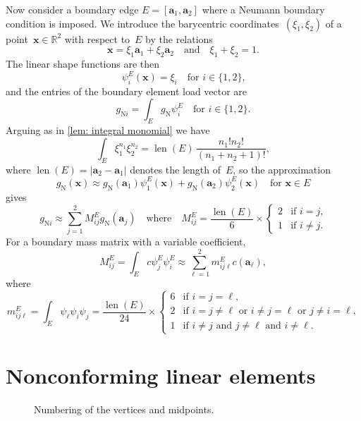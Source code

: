 \documentclass[a4paper,12pt]{article}
\newcommand{\bs}[1]{\boldsymbol{#1}}
\newcommand{\len}{\operatorname{len}}
\newcommand{\uN}{\mathrm{N}}
\begin{document}
Now consider a boundary edge $E=[\bs{a}_1,\bs{a}_2]$ where a Neumann boundary
condition is imposed.  We introduce the barycentric coordinates~$(\xi_1,\xi_2)$
of a point~$\bs{x}\in\mathbb{R}^2$ with respect to~$E$ by the relations
\[
\bs{x}=\xi_1\bs{a}_1+\xi_2\bs{a}_2\quad\text{and}\quad\xi_1+\xi_2=1.
\]
The linear shape functions are then
\[
\psi^E_i(\bs{x})=\xi_i\quad\text{for $i\in\{1,2\}$,}
\]
and the entries of the boundary element load vector are
\[
g_{\uN i}=\int_Eg_{\uN}\psi^E_i\quad\text{for $i\in\{1,2\}$.}
\]
Arguing as in \cref{lem: integral monomial} we have
\[
\int_E\xi_1^{n_1}\xi_2^{n_2}=\len(E)\,\frac{n_1!n_2!}{(n_1+n_2+1)!},
\]
where $\len(E)=|\bs{a}_2-\bs{a}_1|$ denotes the length of~$E$,
so the approximation
\[
g_{\uN}(\bs{x})\approx g_{\uN}(\bs{a}_1)\psi^E_1(\bs{x})
+g_{\uN}(\bs{a}_2)\psi^E_2(\bs{x})\quad\text{for $\bs{x}\in E$}
\]
gives
\begin{equation}\label{eq: boundary element vector}
g_{\uN i}\approx\sum_{j=1}^2M^E_{ij}g_{\uN}(\bs{a}_j)
\quad\text{where}\quad M^E_{ij}=\frac{\len(E)}{6}\times\begin{cases}
    2&\text{if $i=j$,}\\
    1&\text{if $i\ne j$.}
\end{cases}
\end{equation}
For a boundary mass matrix with a variable coefficient,
\[
M^E_{ij}=\int_E c\psi^E_j\psi^E_i
\approx\sum_{\ell=1}^2m^E_{ij\ell}c(\bs{a}_\ell),
\]
where
\[
m^E_{ij\ell}=\int_E\psi_\ell\psi_i\psi_j=\frac{\len(E)}{24}\times\begin{cases}
    6&\text{if $i=j=\ell$,}\\
    2&\text{if $i=j\ne\ell$ or $i\ne j=\ell$ or $j\ne i=\ell$,}\\
    1&\text{if $i\ne j$ and $j\ne\ell$ and $i\ne\ell$.}
\end{cases}
\]


\section{Nonconforming linear elements}\label{sec: nonconforming}

\begin{figure}
\caption{Numbering of the vertices and midpoints.}\label{fig: vertex midpt}
\begin{center}
\end{center}
\end{figure}
\end{document}
